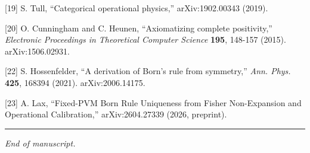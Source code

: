 \documentclass[
]{article}
\begin{document}
{[}19{]} S. Tull, ``Categorical operational physics,'' arXiv:1902.00343
(2019).

{[}20{]} O. Cunningham and C. Heunen, ``Axiomatizing complete
positivity,'' \emph{Electronic Proceedings in Theoretical Computer
Science} \textbf{195}, 148-157 (2015). arXiv:1506.02931.

{[}22{]} S. Hossenfelder, ``A derivation of Born's rule from symmetry,''
\emph{Ann. Phys.} \textbf{425}, 168394 (2021). arXiv:2006.14175.

{[}23{]} A. Lax, ``Fixed-PVM Born Rule Uniqueness from Fisher
Non-Expansion and Operational Calibration,'' arXiv:2604.27339 (2026,
preprint).

\begin{center}\rule{0.5\linewidth}{0.5pt}\end{center}

\emph{End of manuscript.}
\end{document}
